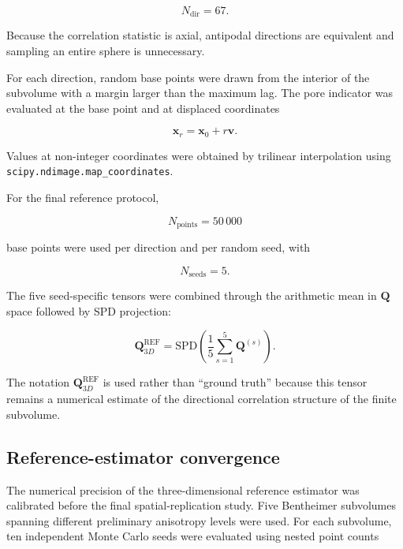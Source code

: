 \documentclass{article}
\begin{document}
\begin{equation}
    N_{\mathrm{dir}}=67.
\end{equation}

Because the correlation statistic is axial, antipodal directions are
equivalent and sampling an entire sphere is unnecessary.

For each direction, random base points were drawn from the interior of
the subvolume with a margin larger than the maximum lag. The pore
indicator was evaluated at the base point and at displaced coordinates

\begin{equation}
    \mathbf{x}_r
    =
    \mathbf{x}_0+r\mathbf{v}.
\end{equation}

Values at non-integer coordinates were obtained by trilinear
interpolation using \texttt{scipy.ndimage.map\_coordinates}.

For the final reference protocol,

\begin{equation}
    N_{\mathrm{points}}=50\,000
\end{equation}

base points were used per direction and per random seed, with

\begin{equation}
    N_{\mathrm{seeds}}=5.
\end{equation}

The five seed-specific tensors were combined through the arithmetic
mean in $\mathbf{Q}$ space followed by SPD projection:

\begin{equation}
    \mathbf{Q}^{\mathrm{REF}}_{3D}
    =
    \mathrm{SPD}
    \left(
    \frac{1}{5}
    \sum_{s=1}^{5}
    \mathbf{Q}^{(s)}
    \right).
    \label{eq:SI_consensus}
\end{equation}

The notation
$\mathbf{Q}^{\mathrm{REF}}_{3D}$ is used rather than ``ground truth''
because this tensor remains a numerical estimate of the directional
correlation structure of the finite subvolume.

\subsection{Reference-estimator convergence}
\label{sec:SI_reference_convergence}

The numerical precision of the three-dimensional reference estimator was
calibrated before the final spatial-replication study. Five Bentheimer
subvolumes spanning different preliminary anisotropy levels were used.
For each subvolume, ten independent Monte Carlo seeds were evaluated
using nested point counts
\end{document}
